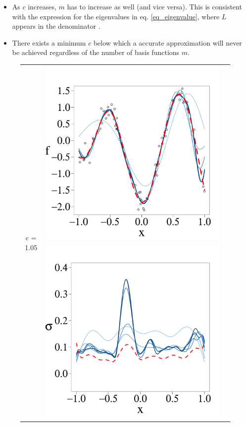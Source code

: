 \documentclass[onecolumn,a4paper,11pt]{article}
\begin{document}
\begin{itemize}
\item As $c$ increases, $m$ has to increase as well (and vice versa). This is consistent with the expression for the eigenvalues in eq. \eqref{eq_eigenvalue}, where $L$ appears in the denominator	.
\item There exists a minimum $c$ below which a accurate approximation will never be achieved regardless of the number of basis functions $m$.
\end{itemize}


\begin{figure}
\centering
\begin{tabular}{ c c c }
\arrayrulecolor{darkgray}\hline
c = 1.05 &
\includegraphics[scale=0.215, trim = 0mm 14mm 0mm 14mm, clip]{ch5_fig3_Post_part1.pdf}
\includegraphics[scale=0.215, trim = 0mm 14mm 0mm 14mm, clip]{ch5_fig3_Sigma_part1.pdf} 

\end{tabular}
\end{figure}
\end{document}
